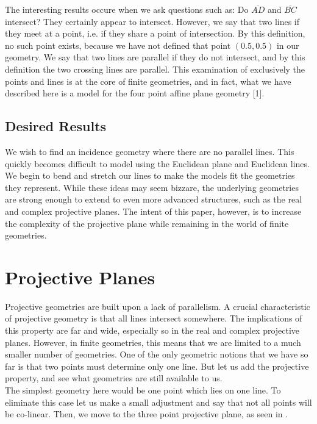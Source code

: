 \documentclass{article}
\begin{document}
The interesting results occure when we ask questions such as: Do $\overline{AD}$ and $\overline{BC}$ intersect? They certainly appear to intersect. However, we say that two lines if they meet at a point, i.e. if they share a point of intersection. By this definition, no such point exists, because we have not defined that point $(0.5,0.5)$ in our geometry. We say that two lines are parallel if they do not intersect, and by this definition the two crossing lines are parallel. This examination of exclusively the points and lines is at the core of finite geometries, and in fact, what we have described here is a model for the four point affine plane geometry [1].

\subsection{Desired Results}
We wish to find an incidence geometry where there are no parallel lines. This quickly becomes difficult to model using the Euclidean plane and Euclidean lines. We begin to bend and stretch our lines to make the models fit the geometries they represent. While these ideas may seem bizzare, the underlying geometries are strong enough to extend to even more advanced structures, such as the real and complex projective planes. The intent of this paper, however, is to increase the complexity of the projective plane while remaining in the world of finite geometries. 

\section{Projective Planes}
Projective geometries are built upon a lack of parallelism. A crucial characteristic of projective geometry is that all lines intersect somewhere. The implications of this property are far and wide, especially so in the real and complex projective planes. However, in finite geometries, this means that we are limited to a much smaller number of geometries. One of the only geometric notions that we have so far is that two points must determine only one line. But let us add the projective property, and see what geometries are still available to us. \\

The simplest geometry here would be one point which lies on one line. To eliminate this case let us make a small adjustment and say that not all points will be co-linear. Then, we move to the three point projective plane, as seen in . 
\end{document}
